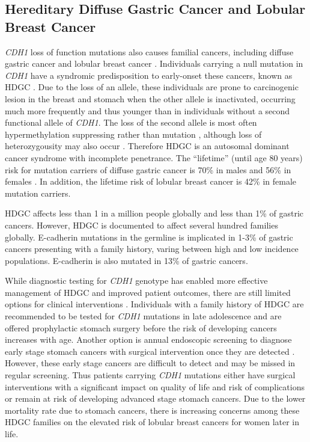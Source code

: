 \subsection{Hereditary Diffuse Gastric Cancer and Lobular Breast Cancer}


\textit{CDH1} loss of function \glspl{mutation} also causes \gls{familial} cancers, including diffuse gastric cancer and lobular breast cancer \citep{HDGC,Graziano2003,Guilford2010,Oliveira2009}. Individuals carrying a null \gls{mutation} in \textit{CDH1} have a syndromic predisposition to early-onset these cancers, known as \gls{HDGC} \citep{Guilford1998}. Due to the loss of an \gls{allele}, these individuals are prone to carcinogenic lesion in the breast and stomach when the other \gls{allele} is inactivated, occurring much more frequently and thus younger than in individuals without a second functional \gls{allele} of \textit{CDH1}. The loss of the second \gls{allele} is most often hypermethylation suppressing  rather than \gls{mutation} \citep{Grady2000, Oliveira2009, Machado2001}, although loss of heterozygousity may also occur \citep{Guilford2010}. Therefore \gls{HDGC} is an autosomal dominant cancer syndrome with incomplete penetrance. The ``lifetime'' (until age 80 years) risk for \gls{mutation} carriers  of diffuse gastric cancer is 70\% in males and 56\% in females \citep{Hansford2015,vanderPost2015}. In addition, the lifetime risk of lobular breast cancer is 42\% in female \gls{mutation} carriers.   

\gls{HDGC} affects less than 1 in a million people globally \citep{Ferlay2015} and less than 1\% of gastric cancers. However, \gls{HDGC} is documented to affect several hundred families globally. \gls{E-cadherin} \glspl{mutation} in the \gls{germline} is implicated in 1-3\% of gastric cancers presenting with a family history, varing between high and low incidence populations. \gls{E-cadherin} is also mutated in 13\% of  gastric cancers.

While diagnostic testing for \textit{CDH1} genotype has enabled more effective management of \gls{HDGC} and improved patient outcomes, there are still limited options for clinical interventions \citep{Guilford2010}. Individuals with a family history of \gls{HDGC} are recommended to be tested for \textit{CDH1} \glspl{mutation} in late adolescence and are offered prophylactic stomach surgery before the risk of developing cancers increases with age. Another option is annual endoscopic screening to diagnose early stage stomach cancers with surgical intervention once they are detected \citep{Oliveira2013}. However, these early stage cancers are difficult to detect and may be missed in regular screening. Thus patients carrying \textit{CDH1} \glspl{mutation} either have surgical interventions with a significant impact on quality of life and risk of complications or remain at risk of developing advanced stage stomach cancers. Due to the lower mortality rate due to stomach cancers, there is increasing concerns among these \gls{HDGC} families on the elevated risk of lobular breast cancers for women later in life.

